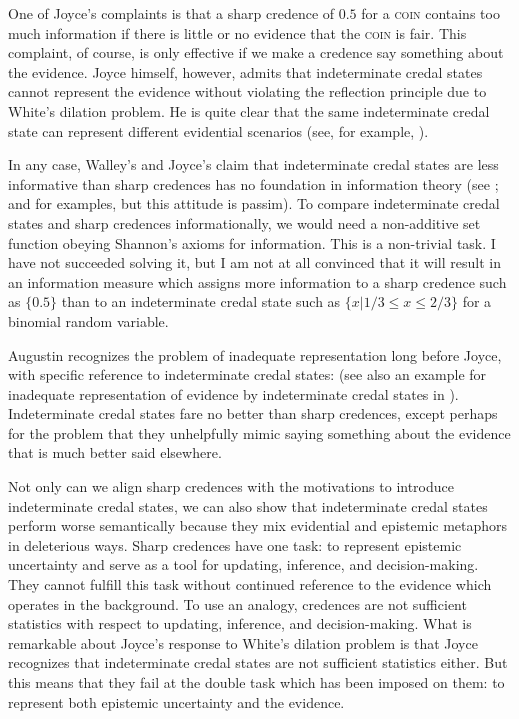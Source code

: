 One of Joyce's complaints is that a sharp credence of
$0.5$ for a \textsc{coin} contains too much information
if there is little or no evidence that the
\textsc{coin} is fair. This complaint, of course, is
only effective if we make a credence say something
about the evidence. Joyce himself, however, admits that
indeterminate credal states cannot represent the
evidence without violating the reflection principle due
to White's dilation problem. He is quite clear that the
same indeterminate credal state can represent different
evidential scenarios (see, for example,
).

In any case, Walley's and Joyce's claim that
indeterminate credal states are less informative than
sharp credences has no foundation in information theory
(see ; and
 for examples, but this attitude
is passim). To compare indeterminate credal states and
sharp credences informationally, we would need a
non-additive set function obeying Shannon's axioms for
information. This is a non-trivial task. I have not
succeeded solving it, but I am not at all convinced
that it will result in an information measure which
assigns more information to a sharp credence such as
$\{0.5\}$ than to an indeterminate credal state such as
$\{x|1/3\leq{}x\leq{}2/3\}$ for a binomial random
variable.

Augustin recognizes the problem of inadequate
representation long before Joyce, with specific
reference to indeterminate credal states: 
 (see also an example for
inadequate representation of evidence by indeterminate
credal states in ).
Indeterminate credal states fare no better than sharp
credences, except perhaps for the problem that they
unhelpfully mimic saying something about the evidence
that is much better said elsewhere.

Not only can we align sharp credences with the
motivations to introduce indeterminate credal states,
we can also show that indeterminate credal states
perform worse semantically because they mix evidential
and epistemic metaphors in deleterious ways. Sharp
credences have one task: to represent epistemic
uncertainty and serve as a tool for updating,
inference, and decision-making. They cannot fulfill
this task without continued reference to the evidence
which operates in the background. To use an analogy,
credences are not sufficient statistics with respect to
updating, inference, and decision-making. What is
remarkable about Joyce's response to White's dilation
problem is that Joyce recognizes that indeterminate
credal states are not sufficient statistics either. But
this means that they fail at the double task which has
been imposed on them: to represent both epistemic
uncertainty and the evidence.

